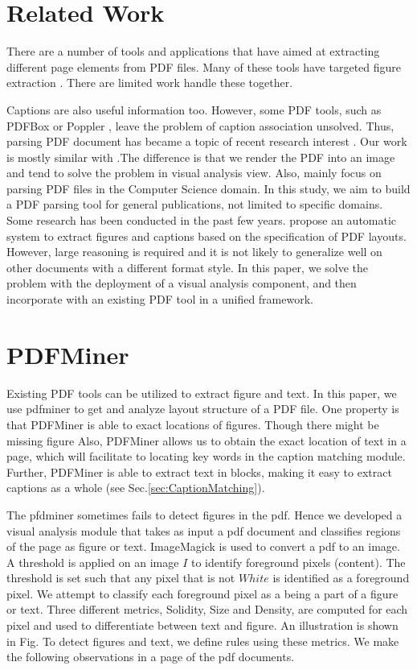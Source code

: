 \documentclass{article}
\begin{document}
\section{Related Work}
There are a number of tools and applications that have aimed at extracting different page elements from PDF files. Many of these 
tools have targeted figure extraction \cite{ray2015automatic, choudhury2015automated}. There are limited work handle these together. 


Captions are also useful information too. However, some PDF tools, such as PDFBox \cite{pdfbox2014processing} or Poppler \cite{poppler}, leave the problem of caption association unsolved.
Thus, parsing PDF document has became a topic of recent research interest
 \cite{lopez2011automatic,praczyk2013automatic,choudhury2013figure,clark2015looking,clark2016pdffigures}.
Our work is mostly similar with \cite{clark2016pdffigures}.The difference is that
we render the PDF into an image and tend to solve the problem in visual analysis view.
Also, \cite{clark2016pdffigures} mainly focus on parsing PDF files in the Computer Science domain. 
In this study, we aim to build a PDF parsing tool for general publications, not limited to specific domains. Some research has been conducted in the past few years.
\cite{lopez2011automatic} propose an automatic system to extract figures and captions based on the specification of PDF layouts. However, large reasoning is required and it is not likely to generalize well on other documents with a different format style. In this paper, we solve the problem with the deployment of a visual analysis component, and then incorporate with an existing PDF tool in a unified framework. 

\section{PDFMiner}
Existing PDF tools can be utilized to extract figure and text. In this paper, we use pdfminer \cite{shinyama2010pdfminer} to get and analyze layout structure of a PDF file. 
One property is that PDFMiner is able to exact locations of figures. Though there might be missing figure
Also, PDFMiner allows us to obtain the exact location of text in a page, which will facilitate to locating key words in the caption matching module. Further, PDFMiner is able to extract text in blocks, making it easy to extract captions as a whole (see Sec.\ref{sec:CaptionMatching}). 

The pfdminer sometimes fails to detect figures in the pdf. Hence we developed a visual analysis module that takes as input a pdf document and classifies regions of the page as figure or text. ImageMagick is used to convert a pdf to an image. A threshold is applied on an image $I$ to identify foreground pixels (content). The threshold is set such that any pixel that is not $White$ is identified as a foreground pixel. We attempt to classify each foreground pixel as a being a part of a figure or text. Three different metrics, Solidity, Size and Density, are computed for each pixel and used to differentiate between text and figure. An illustration is shown in Fig.
To detect figures and text, we define rules using these metrics. We make the following observations in a page of the pdf documents.
\end{document}
